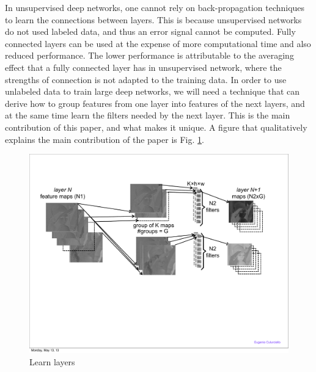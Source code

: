 \documentclass{article} %
\begin{document}
In unsupervised deep networks, one cannot rely on back-propagation techniques to learn the connections between layers. This is because unsupervised networks do not used labeled data, and thus an error signal cannot be computed. Fully connected layers can be used \cite{culurciello2013clustering,coates_analysis_2011} at the expense of more computational time and also reduced performance. The lower performance is attributable to the averaging effect that a fully connected layer has in unsupervised network, where the strengths of connection is not adapted to the training data.
In order to use unlabeled data to train large deep networks, we will need a technique that can derive how to group features from one layer into features of the next layers, and at the same time learn the filters needed by the next layer.
This is the main contribution of this paper, and what makes it unique. A figure that qualitatively explains the main contribution of the paper is Fig. \ref{fig-learnlayers}.


\begin{figure}
\includegraphics[width=5in]{fig-learnlayers.pdf}
\caption{Learn layers}
\label{fig-learnlayers}
\end{figure}
\end{document}
